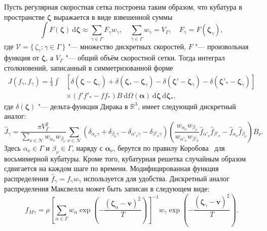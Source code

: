 \documentclass[
aps,%
12pt,%
final,%
notitlepage,%
oneside,%
onecolumn,%
nobibnotes,%
nofootinbib,%
superscriptaddress,%
noshowpacs,%
centertags]%
{revtex4}
\newcommand{\dd}{\:\mathrm{d}}
\newcommand{\dzeta}{\boldsymbol{\dd\zeta}}
\newcommand{\bzeta}{\boldsymbol{\zeta}}
\newcommand{\Nu}{\mathcal{N}}
\newcommand{\Set}[2]{\{\,{#1}:{#2}\,\}}
\begin{document}
Пусть регулярная скоростная сетка построена таким образом,
что кубатура в пространстве \(\bzeta\) выражается в виде взвешенной суммы
\begin{equation}\label{eq:zeta_cubature}
    \int F(\bzeta) \dzeta \approx \sum_{\gamma\in\Gamma} F_\gamma w_\gamma,
        \quad \sum_{\gamma\in\Gamma} w_\gamma = V_\Gamma,
        \quad F_\gamma = F(\bzeta_\gamma),
\end{equation}
где \(\mathcal{V} = \Set{\zeta_\gamma}{\gamma\in\Gamma}\) "--- множество дискретных скоростей,
\(F\) "--- произвольная функция от \(\bzeta\),
а \(V_\Gamma\) "--- общий объём скоростной сетки.
Тогда интеграл столкновений, записанный в симметризованной форме
\begin{equation}\label{eq:symm_ci}
    \begin{aligned}
    J(f_\gamma, f_\gamma) = \frac14\int &\left[
        \delta(\bzeta-\bzeta_\gamma) + \delta(\bzeta_*-\bzeta_\gamma)
        - \delta(\bzeta'-\bzeta_\gamma) - \delta(\bzeta'_*-\bzeta_\gamma)\right] \\
        &\times(f'f'_* - ff_*)B \dd\Omega(\boldsymbol{\alpha}) \dzeta\dzeta_*,
    \end{aligned}
\end{equation}
где \(\delta(\bzeta)\) "--- дельта-функция Дирака в \(\mathbb{R}^3\),
имеет следующий дискретный аналог:
\begin{equation}\label{eq:discrete_symm_ci}
    \hat{J}_\gamma = \frac{\pi V_\Gamma^2}{\sum_{\nu\in\Nu} w_{\alpha_\nu}w_{\beta_\nu}}
        \sum_{\nu\in\Nu} \left(
            \delta_{\alpha_\nu\gamma} + \delta_{\beta_\nu\gamma}
            - \delta_{\alpha'_\nu\gamma} - \delta_{\beta'_\nu\gamma}
        \right)\left(
            \frac{w_{\alpha_\nu}w_{\beta_\nu}}{w_{\alpha'_\nu}w_{\beta'_\nu}}
            \hat{f}_{\alpha'_\nu}\hat{f}_{\beta'_\nu} - \hat{f}_{\alpha_\nu}\hat{f}_{\beta_\nu}
        \right)B_\nu.
\end{equation}
Здесь \(\alpha_\nu\in\Gamma\) и \(\beta_\nu\in\Gamma\), наряду с \(\boldsymbol{\alpha}_\nu\),
берутся по правилу Коробова~\cite{Korobov1959, Sloan1994} для восьмимерной кубатуры.
Кроме того, кубатурная решетка случайным образом сдвигается на каждом шаге по времени.
Модифицированная функция распределения \(\hat{f}_\gamma = f_\gamma w_\gamma\) используется для удобства.
Дискретный аналог распределения Максвелла может быть записан в следующем виде:
\begin{equation}\label{eq:discrete_Maxwell}
    \hat{f}_{M\gamma} = \rho\left[\sum_{\alpha\in\Gamma}w_\alpha\exp
            \left(-\frac{(\bzeta_\alpha - \boldsymbol{v})^2}{T}\right)
        \right]^{-1}
        w_\gamma\exp\left(-\frac{(\bzeta_\gamma - \boldsymbol{v})^2}{T}\right).
\end{equation}
\end{document}
